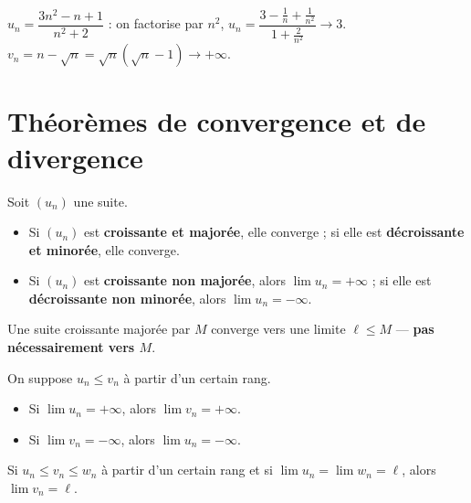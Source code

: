 \begin{exemple}
	$u_n=\dfrac{3n^{2}-n+1}{n^{2}+2}$ : on factorise par $n^{2}$,
	$u_n=\dfrac{3-\frac1n+\frac{1}{n^{2}}}{1+\frac{2}{n^{2}}}\to 3$.
	\qquad
	$v_n=n-\sqrt{n}=\sqrt{n}(\sqrt{n}-1)\to+\infty$.
\end{exemple}


\section{Théorèmes de convergence et de divergence}

\begin{theoreme}
	Soit $(u_n)$ une suite.
	\begin{itemize}[label=\textbullet]
		\item Si $(u_n)$ est \textbf{croissante et majorée}, elle converge ;
		si elle est \textbf{décroissante et minorée}, elle converge.
		\item Si $(u_n)$ est \textbf{croissante non majorée}, alors
		$\displaystyle\lim u_n=+\infty$ ;
		si elle est \textbf{décroissante non minorée}, alors
		$\displaystyle\lim u_n=-\infty$.
	\end{itemize}
\end{theoreme}

\begin{attention}
	Une suite croissante majorée par $M$ converge vers une limite
	$\ell\leq M$ — \textbf{pas nécessairement vers $M$}.
\end{attention}

\begin{theoreme}
	On suppose $u_n\leq v_n$ à partir d'un certain rang.
	\begin{itemize}[label=\textbullet]
		\item Si $\displaystyle\lim u_n=+\infty$, alors $\displaystyle\lim v_n=+\infty$.
		\item Si $\displaystyle\lim v_n=-\infty$, alors $\displaystyle\lim u_n=-\infty$.
	\end{itemize}
\end{theoreme}

\begin{theoreme}
	Si $u_n\leq v_n\leq w_n$ à partir d'un certain rang et si
	$\displaystyle\lim u_n=\lim w_n=\ell$, alors $\displaystyle\lim v_n=\ell$.
\end{theoreme}

